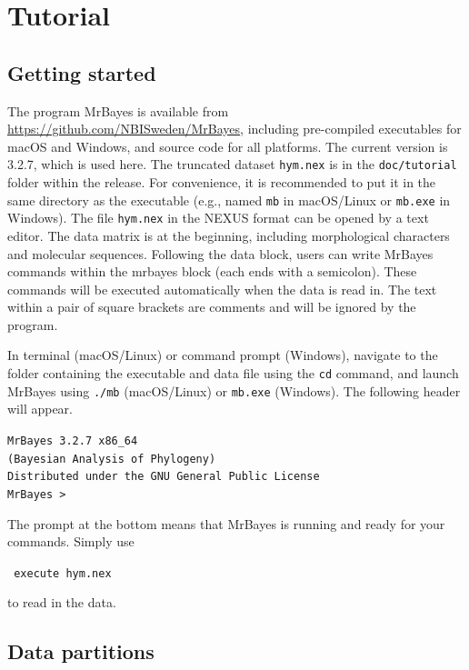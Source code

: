 \documentclass[12pt]{article}
\begin{document}
\section{Tutorial}

\subsection{Getting started}

The program MrBayes is available from \url{https://github.com/NBISweden/MrBayes}, including pre-compiled executables for macOS and Windows, and source code for all platforms. The current version is 3.2.7, which is used here.
The truncated dataset {\tt hym.nex} is in the {\tt doc/tutorial} folder within the release.
For convenience, it is recommended to put it in the same directory as the executable (e.g., named {\tt mb} in macOS/Linux or {\tt mb.exe} in Windows).
The file {\tt hym.nex} in the NEXUS format can be opened by a text editor.
The data matrix is at the beginning, including morphological characters and molecular sequences.
Following the data block, users can write MrBayes commands within the mrbayes block (each ends with a semicolon).
These commands will be executed automatically when the data is read in.
The text within a pair of square brackets are comments and will be ignored by the program.

In terminal (macOS/Linux) or command prompt (Windows), navigate to the folder containing the executable and data file using the {\tt cd} command, and launch MrBayes using {\tt ./mb} (macOS/Linux) or {\tt mb.exe} (Windows). The following header will appear.
\begin{framed}
{\tt \center   MrBayes 3.2.7 x86\_64                \\
           (Bayesian Analysis of Phylogeny)         \\
   Distributed under the GNU General Public License \\
MrBayes > }
\end{framed}
\noindent The prompt at the bottom means that MrBayes is running and ready for your commands. 
Simply use
\begin{framed}
{\tt \noindent
execute hym.nex}	
\end{framed}
\noindent to read in the data.

\subsection{Data partitions}
\end{document}

